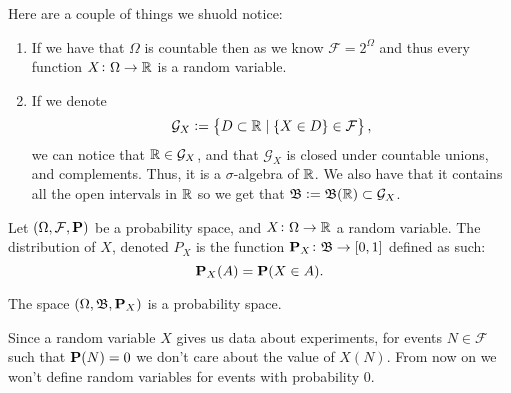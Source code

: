 \documentclass[11pt,a4paper]{article}
\begin{document}
  Here are a couple of things we shuold notice:
  \begin{enumerate}
    \item If we have that $\Omega$ is countable then as we know 
    $\mathcal F = 2^\Omega$ and thus every function $X \colon \Omega \to \mathbb{R}$
    is a random variable.
    \item If we denote 
    \[
      \mathcal G_X := \set{D \subset \mathbb{R}\mid \set{X \in D} \in \mathcal F},
    \]
    we can notice that $\mathbb{R} \in \mathcal G_X$, and that $\mathcal G_X$ is
    closed under countable unions, and complements. 
    Thus, it is a $\sigma$-algebra of $\mathbb{R}$.
    We also have that it contains all the open intervals in $\mathbb{R}$ so we
    get that $\mathfrak B := \mathfrak B(\mathbb{R}) \subset \mathcal G_X$.
  \end{enumerate}
  
  \begin{definition}
    Let $(\Omega, \mathcal F, \mathbf{P})$ be a probability space, and 
    $X \colon \Omega \to \mathbb{R}$ a random variable.
    The distribution of $X$, denoted $P_X$ is the function 
    $\mathbf{P}_X \colon \mathfrak B \to [0,1]$ defined as such:
    \[
      \mathbf{P}_X(A) = \mathbf{P}(X \in A).
    \]
  \end{definition}
  \begin{remark}
    The space $(\Omega, \mathfrak B, \mathbf{P}_X)$ is a probability space.
  \end{remark}
  \begin{remark}
    Since a random variable $X$ gives us data about experiments, for events
    $N \in \mathcal F$ such that $\mathbf{P}(N) = 0$ we don't care about the
    value of $X(N)$. From now on we won't define random variables for events
    with probability $0$.
  \end{remark}
  
\end{document}
